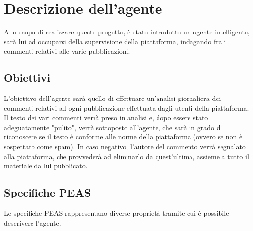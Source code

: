 \documentclass{report}
\begin{document}
    \chapter{Descrizione dell'agente}
    Allo scopo di realizzare questo progetto, è stato introdotto un agente intelligente, sarà lui ad occuparsi della supervisione della piattaforma, indagando fra i 
    commenti relativi alle varie pubblicazioni.
    \section{Obiettivi}
    L'obiettivo dell'agente sarà quello di effettuare un'analisi giornaliera dei commenti relativi ad ogni pubblicazione effettuata dagli utenti della piattaforma.
    Il testo dei vari commenti verrà preso in analisi e, dopo essere stato adeguatamente "pulito", verrà sottoposto all'agente, che sarà in grado di riconoscere se il 
    testo è conforme alle norme della piattaforma (ovvero se non è sospettato come spam). \newline
    In caso negativo, l'autore del commento verrà segnalato alla piattaforma, che provvederà ad eliminarlo da quest'ultima, assieme a tutto il materiale da lui pubblicato.

    \section{Specifiche PEAS}
    Le specifiche PEAS rappresentano diverse proprietà tramite cui è possibile descrivere l'agente. \newline
\end{document}
